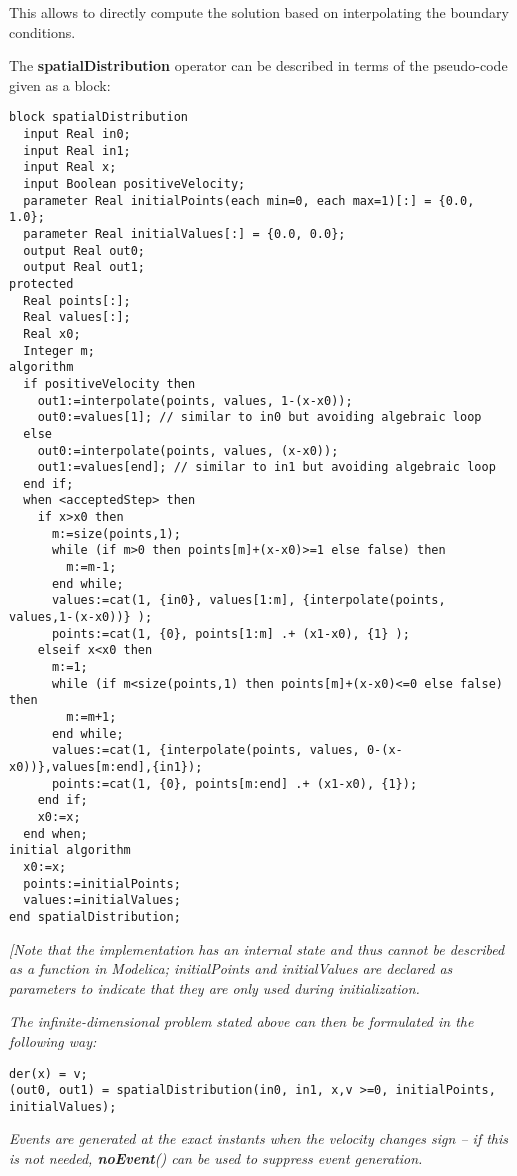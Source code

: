 This allows to directly compute the solution based on interpolating the
boundary conditions.

The \textbf{spatialDistribution} operator can be described in terms of
the pseudo-code given as a block:
\begin{lstlisting}[language=modelica]
block spatialDistribution
  input Real in0;
  input Real in1;
  input Real x;
  input Boolean positiveVelocity;
  parameter Real initialPoints(each min=0, each max=1)[:] = {0.0, 1.0};
  parameter Real initialValues[:] = {0.0, 0.0};
  output Real out0;
  output Real out1;
protected
  Real points[:];
  Real values[:];
  Real x0;
  Integer m;
algorithm
  if positiveVelocity then
    out1:=interpolate(points, values, 1-(x-x0));
    out0:=values[1]; // similar to in0 but avoiding algebraic loop
  else
    out0:=interpolate(points, values, (x-x0));
    out1:=values[end]; // similar to in1 but avoiding algebraic loop
  end if;
  when <acceptedStep> then
    if x>x0 then
      m:=size(points,1);
      while (if m>0 then points[m]+(x-x0)>=1 else false) then
        m:=m-1;
      end while;
      values:=cat(1, {in0}, values[1:m], {interpolate(points, values,1-(x-x0))} );
      points:=cat(1, {0}, points[1:m] .+ (x1-x0), {1} );
    elseif x<x0 then
      m:=1;
      while (if m<size(points,1) then points[m]+(x-x0)<=0 else false) then
        m:=m+1;
      end while;
      values:=cat(1, {interpolate(points, values, 0-(x-x0))},values[m:end],{in1});
      points:=cat(1, {0}, points[m:end] .+ (x1-x0), {1});
    end if;
    x0:=x;
  end when;
initial algorithm
  x0:=x;
  points:=initialPoints;
  values:=initialValues;
end spatialDistribution;
\end{lstlisting}

\emph{{[}Note that the implementation has an internal state and thus
cannot be described as a function in Modelica; initialPoints and
initialValues are declared as parameters to indicate that they are only
used during initialization. }

\emph{The infinite-dimensional problem stated above can then be
formulated in the following way:}

\begin{lstlisting}[language=modelica]
der(x) = v;
(out0, out1) = spatialDistribution(in0, in1, x,v >=0, initialPoints, initialValues);
\end{lstlisting}

\emph{Events are generated at the exact instants when the velocity
changes sign -- if this is not needed, \textbf{noEvent}() can be used to
suppress event generation.}

